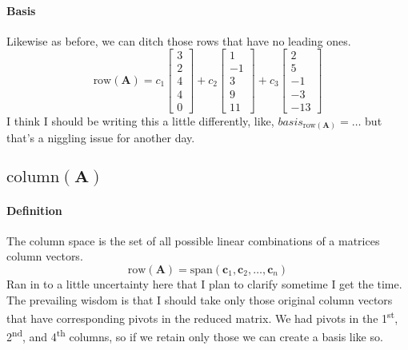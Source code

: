 \documentclass{article}
\begin{document}
            \paragraph{Basis}
                Likewise as before, we can ditch those rows that have no leading ones.
                \[
                    \text{row}(\mathbf{A})=c_1\begin{bmatrix}3\\2\\4\\4\\0\end{bmatrix}+c_2\begin{bmatrix}1\\-1\\3\\9\\11\end{bmatrix}+c_3\begin{bmatrix}2\\5\\-1\\-3\\-13\end{bmatrix}
                \]
                I think I should be writing this a little differently, like,
                $basis_{\text{row}(\mathbf{A})}=\dots$ but that's a niggling issue for another day.
        \subsection[The column space of A]{$\text{column}(\mathbf{A})$}
            \paragraph{Definition}
                The column space is the set of all possible linear combinations of a matrices column vectors.
                \[
                    \text{row}(\mathbf{A})=\text{span}(\mathbf{c}_1,\mathbf{c}_2,\dots,\mathbf{c}_n)
                \]
            Ran in to a little uncertainty here that I plan to clarify sometime I get the time.
            The prevailing wisdom is that I should take only those original column vectors that
            have corresponding pivots in the reduced matrix. 
            We had pivots in the 1\textsuperscript{st}, 2\textsuperscript{nd}, and 4\textsuperscript{th} columns,
            so if we retain only those we can create a basis like so.
\end{document}
